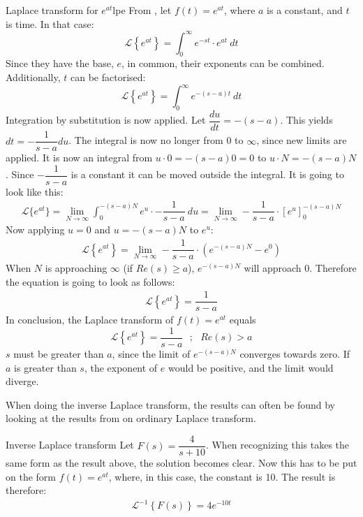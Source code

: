 \begin{example}{Laplace transform for $e^{at}$}{lpe}
From , let $f(t)=e^{at}$, where $a$ is a constant, and $t$ is time. In that case:
$$\mathcal{L} \left\{e^{at} \right\}=\int_{0}^{\infty} e^{-st}\cdot e^{at}\ dt$$
Since they have the base, $e$, in common, their exponents can be combined. Additionally, $t$ can be factorised:
$$\mathcal{L} \left\{e^{at} \right\}=\int_{0}^{\infty} e^{-(s-a)t}\ dt$$
Integration by substitution is now applied. Let $\dfrac{du}{dt}=-(s-a)$. This yields $dt=-\dfrac{1}{s-a}du$. The integral is now no longer from 0 to $\infty$, since new limits are applied. It is now an integral from $u \cdot 0=-(s-a)0=0$ to $u\cdot N=-(s-a)N$. Since $-\dfrac{1}{s-a}$ is a constant it can be moved outside the integral. It is going to look like this:
\begin{align}
\mathcal{L}\{e^{at}\}=\lim_{N \to \infty} \int_{0}^{-(s-a)N} e^{u}\cdot -\dfrac{1}{s-a}\ du = \lim_{N \to \infty} -\dfrac{1}{s-a} \cdot \left[e^{u} \right]_{0}^{-(s-a)N}
\label{eq6.2}
\end{align}
Now applying $u=0$ and $u=-(s-a)N$ to $e^{u}$:
\begin{align*}
\mathcal{L} \left\{e^{at} \right\} =\lim_{N \to \infty} -\dfrac{1}{s-a}\cdot (e^{-(s-a)N}-e^{0})
\end{align*}
When $N$ is approaching $\infty$ (if $Re(s) \geq a$), $e^{-(s-a)N}$ will approach $0$. Therefore the equation is going to look as follows:
\begin{align}
\mathcal{L} \left\{e^{at} \right\} = \dfrac{1}{s-a}
\end{align}
In conclusion, the Laplace transform of $f(t)=e^{at}$ equals
$$\mathcal{L} \left\{e^{at} \right\} =\dfrac{1}{s-a} \ \ \ ;\ \ \ Re(s)>a$$
$s$ must be greater than $a$, since the limit of $e^{-(s-a)N}$ converges towards zero. If $a$ is greater than $s$, the exponent of $e$ would be positive, and the limit would diverge.
\end{example}
\noindent When doing the inverse Laplace transform, the results can often be found by looking at the results from on ordinary Laplace transform.
\begin{example}{Inverse Laplace transform}{}
Let $F(s) = \dfrac{4}{s+10}$. When recognizing this takes the same form as the result above, the solution becomes clear. Now this has to be put on the form $f(t)=e^{at}$, where, in this case, the constant is 10. The result is therefore:
\begin{align*}
\mathcal{L}^{-1} \left\{F(s) \right\} = 4e^{-10t}
\end{align*}
\end{example}
